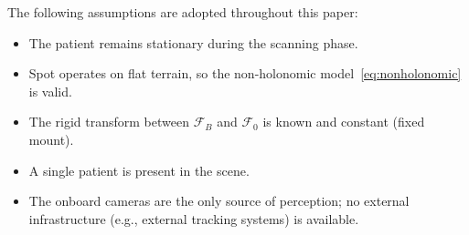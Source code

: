 \noindent
The following assumptions are adopted throughout this paper:
\begin{itemize}
  \item[\textbf{A1}] The patient remains stationary during the scanning phase.
  \item[\textbf{A2}] Spot operates on flat terrain, so the non-holonomic
        model~\eqref{eq:nonholonomic} is valid.
  \item[\textbf{A3}] The rigid transform between $\mathcal{F}_B$ and
        $\mathcal{F}_0$ is known and constant (fixed mount).
  \item[\textbf{A4}] A single patient is present in the scene.
  \item[\textbf{A5}] The onboard cameras are the only source of perception;
        no external infrastructure (e.g., external tracking systems) is
        available.
\end{itemize}
